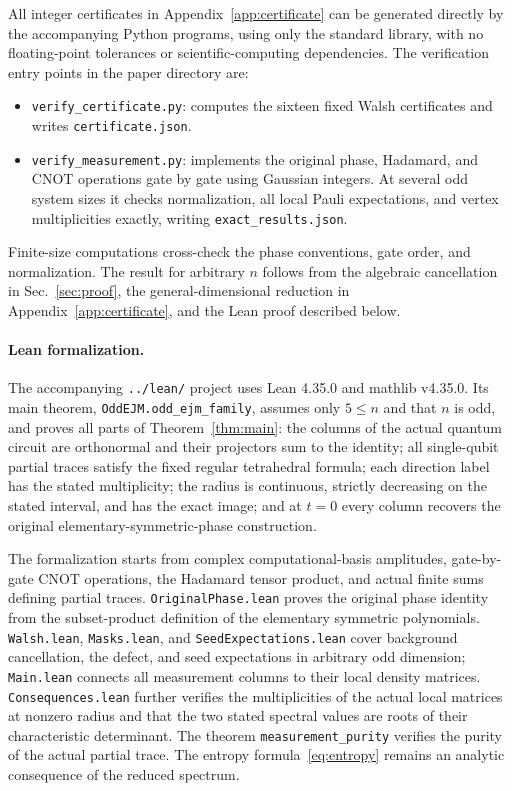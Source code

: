 \documentclass[11pt,a4paper]{article}
\numberwithin{equation}{section}
\theoremstyle{definition}
\newcommand{\code}[1]{\nolinkurl{#1}}
\begin{document}
All integer certificates in Appendix~\ref{app:certificate} can be generated directly by the accompanying Python programs, using only the standard library, with no floating-point tolerances or scientific-computing dependencies. The verification entry points in the paper directory are:
\begin{itemize}[leftmargin=2em,itemsep=0.35em]
\item \code{verify_certificate.py}: computes the sixteen fixed Walsh certificates and writes \code{certificate.json}.
\item \code{verify_measurement.py}: implements the original phase, Hadamard, and CNOT operations gate by gate using Gaussian integers. At several odd system sizes it checks normalization, all local Pauli expectations, and vertex multiplicities exactly, writing \code{exact_results.json}.
\end{itemize}
Finite-size computations cross-check the phase conventions, gate order, and normalization. The result for arbitrary $n$ follows from the algebraic cancellation in Sec.~\ref{sec:proof}, the general-dimensional reduction in Appendix~\ref{app:certificate}, and the Lean proof described below.

\paragraph{Lean formalization.}
The accompanying \code{../lean/} project uses Lean 4.35.0 and mathlib v4.35.0. Its main theorem, \code{OddEJM.odd_ejm_family}, assumes only $5\leq n$ and that $n$ is odd, and proves all parts of Theorem~\ref{thm:main}: the columns of the actual quantum circuit are orthonormal and their projectors sum to the identity; all single-qubit partial traces satisfy the fixed regular tetrahedral formula; each direction label has the stated multiplicity; the radius is continuous, strictly decreasing on the stated interval, and has the exact image; and at $t=0$ every column recovers the original elementary-symmetric-phase construction.

The formalization starts from complex computational-basis amplitudes, gate-by-gate CNOT operations, the Hadamard tensor product, and actual finite sums defining partial traces. \code{OriginalPhase.lean} proves the original phase identity from the subset-product definition of the elementary symmetric polynomials. \code{Walsh.lean}, \code{Masks.lean}, and \code{SeedExpectations.lean} cover background cancellation, the defect, and seed expectations in arbitrary odd dimension; \code{Main.lean} connects all measurement columns to their local density matrices. \code{Consequences.lean} further verifies the multiplicities of the actual local matrices at nonzero radius and that the two stated spectral values are roots of their characteristic determinant. The theorem \code{measurement_purity} verifies the purity of the actual partial trace. The entropy formula~\eqref{eq:entropy} remains an analytic consequence of the reduced spectrum.
\end{document}
